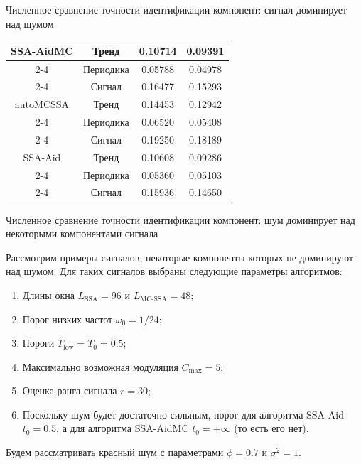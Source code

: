 \documentclass[pdf,notheorems,10pt,intlimits,unicode]{beamer}
\begin{document}
\begin{frame}{Численное сравнение точности идентификации компонент: сигнал доминирует над шумом}
\begin{table}
{{\begin{tabular}{c|c|c|c}
                    \hline
                    SSA-AidMC & Тренд      & 0.10714  & 0.09391    \\
                    \cline{2-4}
                              & Периодика  & 0.05788  & 0.04978    \\
                    \cline{2-4}
                              & Сигнал     & 0.16477  & 0.15293    \\
                    \hline
                    autoMCSSA & Тренд      & 0.14453  & 0.12942    \\
                    \cline{2-4}
                              & Периодика  & 0.06520  & 0.05408    \\
                    \cline{2-4}
                              & Сигнал     & 0.19250  & 0.18189    \\
                    \hline
                    SSA-Aid   & Тренд      & 0.10608  & 0.09286    \\
                    \cline{2-4}
                              & Периодика  & 0.05360  & 0.05103    \\
                    \cline{2-4}
                              & Сигнал     & 0.15936  & 0.14650    \\
                    \hline
                \end{tabular}}
        }
    \end{table}

\end{frame}

\begin{frame}{Численное сравнение точности идентификации компонент: шум доминирует над некоторыми компонентами сигнала}

    Рассмотрим примеры сигналов, некоторые компоненты которых не доминируют над шумом. Для таких сигналов выбраны следующие параметры алгоритмов:\smallskip
    \begin{enumerate}
        \item Длины окна $L_\text{SSA}=96$ и $L_\text{MC-SSA}=48$;\smallskip
        \item Порог низких частот $\omega_0=1/24$;\smallskip
        \item Пороги $T_\text{low}=T_0=0.5$;\smallskip
        \item Максимально возможная модуляция $C_{\max}=5$;\smallskip
        \item Оценка ранга сигнала $r=30$;\smallskip
        \item Поскольку шум будет достаточно сильным, порог для алгоритма SSA-Aid $t_0=0.5$, а для алгоритма SSA-AidMC $t_0=+\infty$ (то есть его нет).\smallskip
    \end{enumerate}
    Будем рассматривать красный шум с параметрами $\phi=0.7$ и $\sigma^2=1$.
    
\end{frame}
\end{document}
